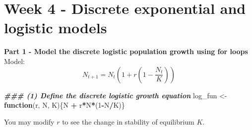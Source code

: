 \documentclass[
]{book}
\newenvironment{Shaded}{\begin{snugshade}}{\end{snugshade}}
\newcommand{\ControlFlowTok}[1]{\textcolor[rgb]{0.13,0.29,0.53}{\textbf{#1}}}
\newcommand{\DecValTok}[1]{\textcolor[rgb]{0.00,0.00,0.81}{#1}}
\newcommand{\DocumentationTok}[1]{\textcolor[rgb]{0.56,0.35,0.01}{\textbf{\textit{#1}}}}
\newcommand{\NormalTok}[1]{#1}
\newcommand{\OtherTok}[1]{\textcolor[rgb]{0.56,0.35,0.01}{#1}}
\newcommand{\SpecialCharTok}[1]{\textcolor[rgb]{0.81,0.36,0.00}{\textbf{#1}}}
\begin{document}
\hypertarget{week-4---discrete-exponential-and-logistic-models}{%
\chapter*{Week 4 - Discrete exponential and logistic models}\label{week-4---discrete-exponential-and-logistic-models}}

\textbf{Part 1 - Model the discrete logistic population growth using for loops}
Model:
\[
N_{t+1} = N_t(1+r(1-\frac{N_t}{K}))
\]

\begin{Shaded}
\begin{Highlighting}[]
\DocumentationTok{\#\#\# (1) Define the discrete logistic growth equation}
\NormalTok{log\_fun }\OtherTok{\textless{}{-}} \ControlFlowTok{function}\NormalTok{(r, N, K)\{N }\SpecialCharTok{+}\NormalTok{ r}\SpecialCharTok{*}\NormalTok{N}\SpecialCharTok{*}\NormalTok{(}\DecValTok{1}\SpecialCharTok{{-}}\NormalTok{N}\SpecialCharTok{/}\NormalTok{K)\}}
\end{Highlighting}
\end{Shaded}

You may modify \(r\) to see the change in stability of equilibrium \(K\).
\end{document}
